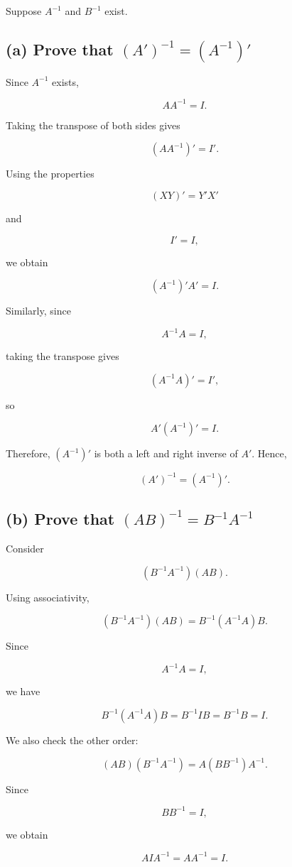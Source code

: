 \documentclass[12pt]{article}
\begin{document}
Suppose $A^{-1}$ and $B^{-1}$ exist.

\subsection*{(a) Prove that $(A')^{-1}=(A^{-1})'$}

Since $A^{-1}$ exists,

\[
AA^{-1}=I.
\]

Taking the transpose of both sides gives

\[
(AA^{-1})'=I'.
\]

Using the properties

\[
(XY)'=Y'X'
\]

and

\[
I'=I,
\]

we obtain

\[
(A^{-1})'A'=I.
\]

Similarly, since

\[
A^{-1}A=I,
\]

taking the transpose gives

\[
(A^{-1}A)'=I',
\]

so

\[
A'(A^{-1})'=I.
\]

Therefore, $(A^{-1})'$ is both a left and right inverse of $A'$. Hence,

\[
\boxed{(A')^{-1}=(A^{-1})'}.
\]

\subsection*{(b) Prove that $(AB)^{-1}=B^{-1}A^{-1}$}

Consider

\[
(B^{-1}A^{-1})(AB).
\]

Using associativity,

\[
(B^{-1}A^{-1})(AB)
=
B^{-1}(A^{-1}A)B.
\]

Since

\[
A^{-1}A=I,
\]

we have

\[
B^{-1}(A^{-1}A)B
=
B^{-1}IB
=
B^{-1}B
=
I.
\]

We also check the other order:

\[
(AB)(B^{-1}A^{-1})
=
A(BB^{-1})A^{-1}.
\]

Since

\[
BB^{-1}=I,
\]

we obtain

\[
AIA^{-1}
=
AA^{-1}
=
I.
\]
\end{document}
